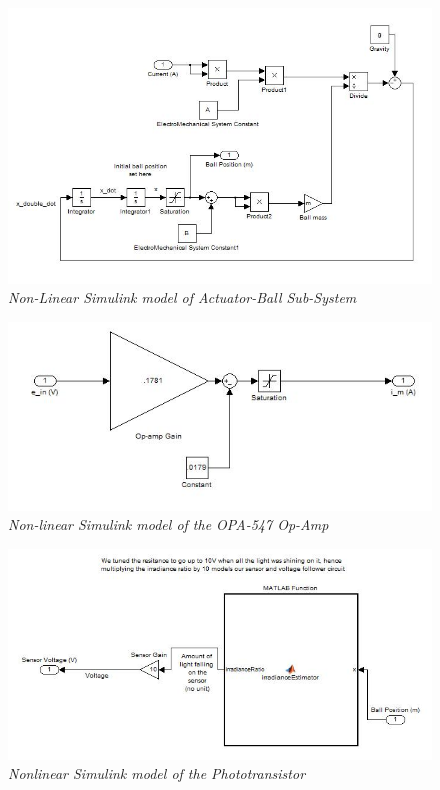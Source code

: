 \documentclass{article}
\theoremstyle{plain}
\theoremstyle{definition}
\theoremstyle{remark}
\begin{document}
\begin{figure}
\begin{center}
\includegraphics[width = 15cm]{NonLinearUnControlledActuatorBall}
\caption{\emph{Non-Linear Simulink model of Actuator-Ball Sub-System}}
\label{Q1_e4}
\end{center}
\end{figure}

\begin{figure}
\begin{center}
\includegraphics[width = 15cm]{NonLinearUnControlledDriver}
\caption{\emph{Non-linear Simulink model of the OPA-547 Op-Amp}}
\label{Q1_e5}
\end{center}
\end{figure}


\begin{figure}
\begin{center}
\includegraphics[width = 15cm]{NonLinearUnControlledPhototransistor}
\caption{\emph{Nonlinear Simulink model of the Phototransistor}}
\label{Q1_e2}
\end{center}
\end{figure}
\end{document}
